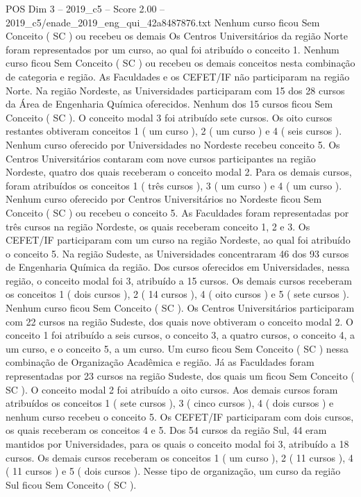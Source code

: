 \begin{textsample}{POS Dim 3 – 2019\_c5 – Score 2.00 – 2019\_c5/enade\_2019\_eng\_qui\_42a8487876.txt}
Nenhum curso ficou Sem Conceito ( SC ) ou recebeu os demais Os Centros Universitários da região Norte foram representados por um curso, ao qual foi atribuído o conceito 1.
Nenhum curso ficou Sem Conceito ( SC ) ou recebeu os demais conceitos nesta combinação de categoria e região.
As Faculdades e os CEFET/IF não participaram na região Norte.
Na região Nordeste, as Universidades participaram com 15 dos 28 cursos da Área de Engenharia Química oferecidos.
Nenhum dos 15 cursos ficou Sem Conceito ( SC ).
O conceito modal 3 foi atribuído sete cursos.
Os oito cursos restantes obtiveram conceitos 1 ( um curso ), 2 ( um curso ) e 4 ( seis cursos ).
Nenhum curso oferecido por Universidades no Nordeste recebeu conceito 5.
Os Centros Universitários contaram com nove cursos participantes na região Nordeste, quatro dos quais receberam o conceito modal 2.
Para os demais cursos, foram atribuídos os conceitos 1 ( três cursos ), 3 ( um curso ) e 4 ( um curso ).
Nenhum curso oferecido por Centros Universitários no Nordeste ficou Sem Conceito ( SC ) ou recebeu o conceito 5.
As Faculdades foram representadas por três cursos na região Nordeste, os quais receberam conceito 1, 2 e 3.
Os CEFET/IF participaram com um curso na região Nordeste, ao qual foi atribuído o conceito 5.
Na região Sudeste, as Universidades concentraram 46 dos 93 cursos de Engenharia Química da região.
Dos cursos oferecidos em Universidades, nessa região, o conceito modal foi 3, atribuído a 15 cursos.
Os demais cursos receberam os conceitos 1 ( dois cursos ), 2 ( 14 cursos ), 4 ( oito cursos ) e 5 ( sete cursos ).
Nenhum curso ficou Sem Conceito ( SC ).
Os Centros Universitários participaram com 22 cursos na região Sudeste, dos quais nove obtiveram o conceito modal 2.
O conceito 1 foi atribuído a seis cursos, o conceito 3, a quatro cursos, o conceito 4, a um curso, e o conceito 5, a um curso.
Um curso ficou Sem Conceito ( SC ) nessa combinação de Organização Acadêmica e região.
Já as Faculdades foram representadas por 23 cursos na região Sudeste, dos quais um ficou Sem Conceito ( SC ).
O conceito modal 2 foi atribuído a oito cursos.
Aos demais cursos foram atribuídos os conceitos 1 ( sete cursos ), 3 ( cinco cursos ), 4 ( dois cursos ) e nenhum curso recebeu o conceito 5.
Os CEFET/IF participaram com dois cursos, os quais receberam os conceitos 4 e 5.
Dos 54 cursos da região Sul, 44 eram mantidos por Universidades, para os quais o conceito modal foi 3, atribuído a 18 cursos.
Os demais cursos receberam os conceitos 1 ( um curso ), 2 ( 11 cursos ), 4 ( 11 cursos ) e 5 ( dois cursos ).
Nesse tipo de organização, um curso da região Sul ficou Sem Conceito ( SC ).

\end{textsample}
